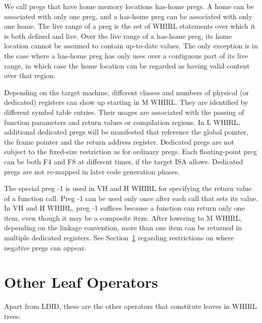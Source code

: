 \documentclass{article}
\begin{document}
\begin{itemize}
We call pregs
that have home memory locations has-home pregs. A home can be
associated with only one preg, and a has-home preg can be associated
with only one home. The live range of a preg is the set of
WHIRL statements over which it is both defined and live. Over the
live range of a has-home preg, its home location cannot be assumed
to contain up-to-date values. The only exception is in the case
where a has-home preg has only uses over a contiguous part of its live
range, in which case the home location can be regarded as having valid
content over that region. 

Depending on the target machine, different classes and numbers of
physical (or dedicated) registers can show up starting in M WHIRL.
They are identified by different symbol table entries. Their usages
are associated with the passing of function parameters and return
values or compilation regions. In L WHIRL, additional dedicated
pregs will be manifested that reference the global pointer, the
frame pointer and the return address register. Dedicated pregs are
not subject to the fixed-size restriction as for ordinary pregs.
Each floating-point preg can be both F4 and F8 at different times,
if the target ISA allows. Dedicated pregs are not re-mapped in
later code generation phases.

The special preg -1 is used in VH and H WHIRL for specifying the
return value of a function call. Preg -1 can be used only once after
each call that sets its value. In VH and H WHIRL, preg -1 suffices
because a function can return only one item, even though it may be
a composite item. After lowering to M WHIRL, depending on the
linkage convention, more than one item can be returned in multiple
dedicated registers. See Section~\ref{} regarding restrictions on
where negative pregs can appear.

\end{itemize}

\section{Other Leaf Operators}

Apart from
%
LDID, these are the other operators that constitute
leaves in WHIRL trees:
\end{document}
